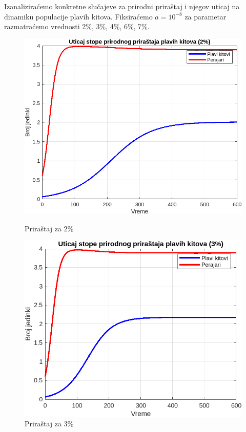 \documentclass[a4paper]{article}
\begin{document}
{	Izanaliziraćemo konkretne slučajeve za prirodni priraštaj i njegov uticaj na dinamiku populacije plavih kitova. Fiksiraćemo $a = 10^{-8}$ za parametar razmatraćemo vrednosti 2\%, 3\%, 4\%, 6\%, 7\%. \\
	
	\iffalse
	
	\begin{figure}[h]
		\centering
		\begin{minipage}[h]{0.45\linewidth}
			\centering
			\includegraphics[width=\textwidth]{uticaj2.png}
			\caption{Priraštaj za 2\%}
			\label{slika1: pp2}
		\end{minipage}
		\hspace{0.5cm} 
		\begin{minipage}[h]{0.45\linewidth}
			\centering
			\includegraphics[width=\textwidth]{uticaj3.png} 
			\caption{Priraštaj za 3\%} 
			\label{slika2: pp3}
		\end{minipage}
	\end{figure}

}
\end{document}
